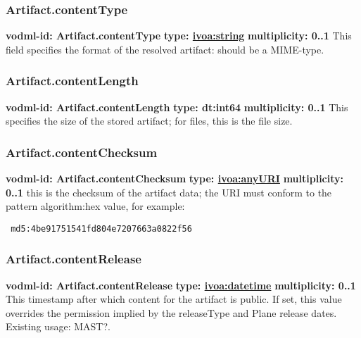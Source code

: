     \subsubsection{Artifact.contentType}
      \textbf{vodml-id: Artifact.contentType} \newline
      \textbf{type: \hyperref[sect:ivoa]{ivoa:string}} \newline
      \textbf{multiplicity: 0..1} \newline
      This field specifies the format of the resolved artifact: should be a MIME-type.

    \subsubsection{Artifact.contentLength}
      \textbf{vodml-id: Artifact.contentLength} \newline
      \textbf{type: dt:int64} \newline
      \textbf{multiplicity: 0..1} \newline
      This specifies the size of the stored artifact; for files, this is the file size.

    \subsubsection{Artifact.contentChecksum}
      \textbf{vodml-id: Artifact.contentChecksum} \newline
      \textbf{type: \hyperref[sect:ivoa]{ivoa:anyURI}} \newline
      \textbf{multiplicity: 0..1} \newline
      this is the checksum of the artifact data; the URI must conform to the pattern {algorithm}:{hex value}, for example: \begin{verbatim} md5:4be91751541fd804e7207663a0822f56 \end{verbatim}

    \subsubsection{Artifact.contentRelease}
      \textbf{vodml-id: Artifact.contentRelease} \newline
      \textbf{type: \hyperref[sect:ivoa]{ivoa:datetime}} \newline
      \textbf{multiplicity: 0..1} \newline
      This timestamp after which content for the artifact is public. If set, this value overrides the permission implied by the releaseType and Plane release dates. Existing usage: MAST?.

